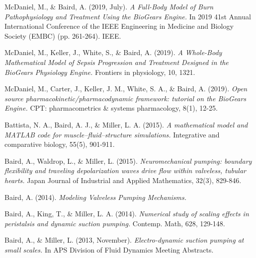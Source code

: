 
\begin{cventries}
  \cventry
    {} %
    {} %
    {} %
    {} %
    {
      \begin{cvitems} %
        \item {McDaniel, M., \& Baird, A. (2019, July). \textit{A Full-Body Model of Burn Pathophysiology and Treatment Using the BioGears Engine.} In 2019 41st Annual International Conference of the IEEE Engineering in Medicine and Biology Society (EMBC) (pp. 261-264). IEEE.}
        \item {McDaniel, M., Keller, J., White, S., \& Baird, A. (2019). \textit{A Whole-Body Mathematical Model of Sepsis Progression and Treatment Designed in the BioGears Physiology Engine.} Frontiers in physiology, 10, 1321.}
        \item{McDaniel, M., Carter, J., Keller, J. M., White, S. A., \& Baird, A. (2019). \textit{Open source pharmacokinetic/pharmacodynamic framework: tutorial on the BioGears Engine.} CPT: pharmacometrics \& systems pharmacology, 8(1), 12-25.}
        \item{Battista, N. A., Baird, A. J., \& Miller, L. A. (2015). \textit{A mathematical model and MATLAB code for muscle–fluid–structure simulations.} Integrative and comparative biology, 55(5), 901-911.}
        \item{Baird, A., Waldrop, L., \& Miller, L. (2015). \textit{Neuromechanical pumping: boundary flexibility and traveling depolarization waves drive flow within valveless, tubular hearts.} Japan Journal of Industrial and Applied Mathematics, 32(3), 829-846.}
        \item{ Baird, A. (2014). \textit{Modeling Valveless Pumping Mechanisms.}}
        \item{ Baird, A., King, T., \& Miller, L. A. (2014). \textit{Numerical study of scaling effects in peristalsis and dynamic suction pumping.} Contemp. Math, 628, 129-148.}
        \item{Baird, A., \& Miller, L. (2013, November). \textit{Electro-dynamic suction pumping at small scales.} In APS Division of Fluid Dynamics Meeting Abstracts.}
      \end{cvitems}
    }
\end{cventries}